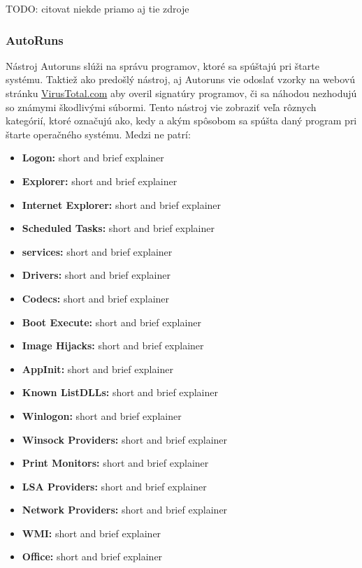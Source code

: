 \documentclass[conference]{IEEEtran}
\begin{document}
TODO: citovat niekde priamo aj tie zdroje

\subsubsection{AutoRuns}
Nástroj Autoruns slúži na správu programov, ktoré sa spúštajú pri štarte systému. Taktiež ako predošlý nástroj, aj Autoruns vie odoslať vzorky na webovú stránku \href{https://www.virustotal.com/gui/home/upload}{VirusTotal.com} aby overil signatúry programov, či sa náhodou nezhodujú so známymi škodlivými súbormi. Tento nástroj vie zobraziť veľa rôznych kategórií, ktoré označujú ako, kedy a akým spôsobom sa spúšta daný program pri štarte operačného systému. 
Medzi ne patrí:
\begin{itemize}
    \item \textbf{Logon:} short and brief explainer
    \item \textbf{Explorer:} short and brief explainer
    \item \textbf{Internet Explorer:} short and brief explainer
    \item \textbf{Scheduled Tasks:} short and brief explainer
    \item \textbf{services:} short and brief explainer
    \item \textbf{Drivers:} short and brief explainer
    \item \textbf{Codecs:} short and brief explainer
    \item \textbf{Boot Execute:} short and brief explainer
    \item \textbf{Image Hijacks:} short and brief explainer
    \item \textbf{AppInit:} short and brief explainer
    \item \textbf{Known ListDLLs:} short and brief explainer
    \item \textbf{Winlogon:} short and brief explainer
    \item \textbf{Winsock Providers:} short and brief explainer
    \item \textbf{Print Monitors:} short and brief explainer
    \item \textbf{LSA Providers:} short and brief explainer
    \item \textbf{Network Providers:} short and brief explainer
    \item \textbf{WMI:} short and brief explainer
    \item \textbf{Office:} short and brief explainer
\end{itemize}
\end{document}
